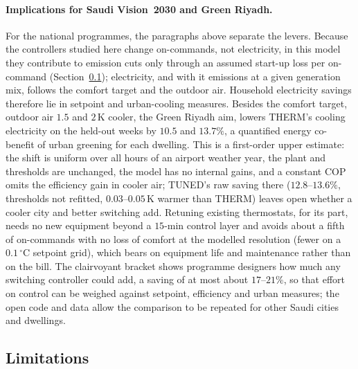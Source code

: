 \documentclass[pdflatex,sn-mathphys-num,iicol]{sn-jnl}
\theoremstyle{thmstyleone}\newtheorem{proposition}{Proposition}\newtheorem{corollary}{Corollary}
\theoremstyle{thmstyletwo}\newtheorem{remark}{Remark}\newtheorem{observation}{Observation}
\theoremstyle{thmstylethree}\newtheorem{definition}{Definition}
\begin{document}
\paragraph{Implications for Saudi Vision~2030 and Green Riyadh.}
For the national programmes, the paragraphs above separate the levers. Because the controllers studied here change on-commands, not electricity, in this model they contribute to emission cuts only through an assumed start-up loss per on-command (Section~\ref{subsec:limits}); electricity, and with it emissions at a given generation mix, follows the comfort target and the outdoor air. Household electricity savings therefore lie in setpoint and urban-cooling measures. Besides the comfort target, outdoor air $1.5$ and $2\,$K cooler, the Green Riyadh aim, lowers THERM's cooling electricity on the held-out weeks by $10.5$ and $13.7\%$, a quantified energy co-benefit of urban greening for each dwelling. This is a first-order upper estimate: the shift is uniform over all hours of an airport weather year, the plant and thresholds are unchanged, the model has no internal gains, and a constant COP omits the efficiency gain in cooler air; TUNED's raw saving there ($12.8$--$13.6\%$, thresholds not refitted, $0.03$--$0.05\,$K warmer than THERM) leaves open whether a cooler city and better switching add. Retuning existing thermostats, for its part, needs no new equipment beyond a $15$-min control layer and avoids about a fifth of on-commands with no loss of comfort at the modelled resolution (fewer on a $0.1\,^\circ$C setpoint grid), which bears on equipment life and maintenance rather than on the bill. The clairvoyant bracket shows programme designers how much any switching controller could add, a saving of at most about $17$--$21\%$, so that effort on control can be weighed against setpoint, efficiency and urban measures; the open code and data allow the comparison to be repeated for other Saudi cities and dwellings.

\subsection{Limitations}
\label{subsec:limits}
\label{subsec:disc_limits}
\end{document}

